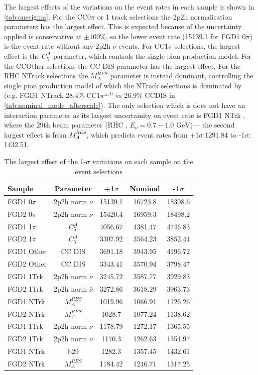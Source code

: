 The largest effects of the variations on the event rates in each sample is shown in \autoref{tab:onesigma}. For the CC0$\pi$ or 1 track selections the 2p2h normalisation parameters has the largest effect. This is expected because of the uncertainty applied is conservative at $\pm100\%$, so the lower event rate (15139.1 for FGD1 0$\pi$) is the event rate without any 2p2h $\nu$ events. For CC1$\pi$ selections, the largest effect is the $C_5^A$ parameter, which controls the single pion production model. For the CCOther selections the CC DIS parameter has the largest effect. For the RHC NTrack selections the $M_A^{RES}$ parameter is instead dominant, controlling the single pion production model of which the NTrack selections is dominated by (e.g. FGD1 NTrack 28.4\% CC1$\pi^{\pm,0}$ vs 26.9\% CCDIS in \autoref{tab:nominal_mode_afterscale}). The only selection which is does not have an interaction parameter as its largest uncertainity on event rate is FGD1 NTrk \numu, where the 29th beam parameter (RHC \numubar, $E_\nu = 0.7-1.0 \text{ GeV}$)--- the second largest effect is from $M_A^{RES}$, which predicts event rates from +1$\sigma$:1291.84 to -1$\sigma$: 1432.51. 

\begin{table}[h]
	\centering
	\begin{tabular}{l | c | c c c }
		\hline
		\hline
		Sample & Parameter & +1$\sigma$ & Nominal & -1$\sigma$ \\
		\hline
		FGD1 0$\pi$ & 2p2h norm $\nu$ & 15139.1 & 16723.8 & 18308.6 \\
		FGD2 0$\pi$ & 2p2h norm $\nu$ & 15420.4 & 16959.3 & 18498.2 \\
		FGD1 1$\pi$ & $C^A_5$ & 4056.67 & 4381.47 & 4746.83 \\
		FGD2 1$\pi$ & $C^A_5$ & 3307.92 & 3564.23 & 3852.44 \\
		FGD1 Other & CC DIS & 3691.18 & 3943.95 & 4196.72 \\
		FGD2 Other & CC DIS & 3343.41 & 3570.94 & 3798.47 \\
		\hline
		FGD1 1Trk & 2p2h norm $\bar{\nu}$ & 3245.72 & 3587.77 & 3929.83 \\ 
		FGD2 1Trk & 2p2h norm $\bar{\nu}$ & 3272.86 & 3618.29 & 3963.73 \\
		FGD1 NTrk & $M_A^{RES}$ & 1019.96 & 1066.91 & 1126.26 \\
		FGD2 NTrk & $M_A^{RES}$ & 1028.7 & 1077.24 & 1138.62 \\
		
		\hline
		FGD1 1Trk \numu & 2p2h norm $\nu$ & 1178.79 & 1272.17 & 1365.55 \\
		FGD2 1Trk \numu & 2p2h norm $\nu$ & 1170.3 & 1262.63 & 1354.97 \\
		FGD1 NTrk \numu & b29 & 1282.3 & 1357.45 & 1432.61 \\
		FGD2 NTrk \numu & $M_A^{RES}$ & 1184.42 & 1246.71 & 1317.25 \\
		\hline
		\hline
	\end{tabular}
	\caption{The largest effect of the 1-$\sigma$ variations on each sample on the event selections}
	\label{tab:onesigma}
\end{table}

